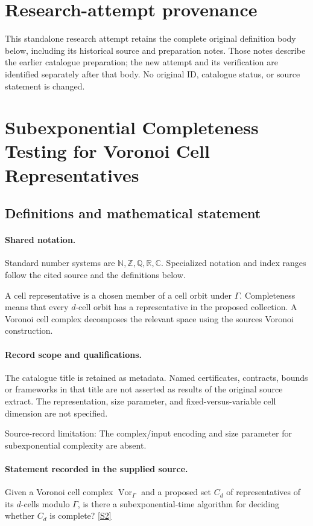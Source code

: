 \documentclass[11pt]{article}
\begin{document}
\section*{Research-attempt provenance}
This standalone research attempt retains the complete original definition body below,
including its historical source and preparation notes. Those notes describe the
earlier catalogue preparation; the new attempt and its verification are identified
separately after that body. No original ID, catalogue status, or source statement is changed.

\section{Subexponential Completeness Testing for Voronoi Cell Representatives}\label{statement}

\subsection{Definitions and mathematical statement}

\paragraph{Shared notation.}Standard number systems are $\mathbb N,\mathbb Z,\mathbb Q,\mathbb R,\mathbb C$. Specialized notation and index ranges follow the cited source and the definitions below.


A cell representative is a chosen member of a cell orbit under $\Gamma$. Completeness means that every $d$-cell orbit has a representative in the proposed collection. A Voronoi cell complex decomposes the relevant space using the source\textquotesingle s Voronoi construction.
\paragraph{Record scope and qualifications.}
The catalogue title is retained as metadata. Named certificates, contracts, bounds or frameworks in that title are not asserted as results of the original source extract.
The representation, size parameter, and fixed-versus-variable cell dimension are not specified.

Source-record limitation: The complex/input encoding and size parameter for subexponential complexity are absent.
\paragraph{Statement recorded in the supplied source.}
Given a Voronoi cell complex $\operatorname{Vor}_\Gamma$ and a proposed set $C_d$ of representatives of its $d$-cells modulo $\Gamma$, is there a subexponential-time algorithm for deciding whether $C_d$ is complete? \href{https://doi.org/10.4171/owr/2016/52}{[S2]}
\end{document}
